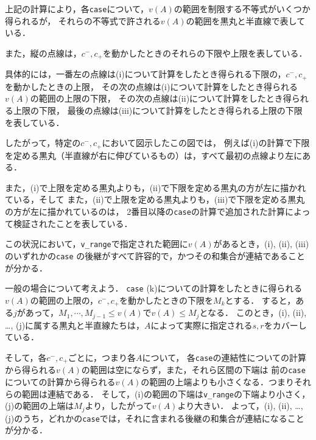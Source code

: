 \documentclass[10pt,a4paper]{ujarticle}
\theoremstyle{definition}
\begin{document}
上記の計算により，各\verb|case|について，$v(A)$の範囲を制限する不等式がいくつか得られるが，
それらの不等式で許される$v(A)$の範囲を黒丸と半直線で表している．

また，縦の点線は，$c^-, c_+$を動かしたときのそれらの下限や上限を表している．

具体的には，一番左の点線は(i)について計算をしたとき得られる下限の，$c^-, c_+$を動かしたときの上限，
その次の点線は(i)について計算をしたとき得られる$v(A)$の範囲の上限の下限，
その次の点線は(ii)について計算をしたとき得られる上限の下限，
最後の点線は(iii)について計算をしたとき得られる上限の下限
を表している．

したがって，特定の$c^-, c_+$において図示したこの図では，
例えば(i)の計算で下限を定める黒丸（半直線が右に伸びているもの）は，すべて最初の点線より左にある．

また，(i)で上限を定める黒丸よりも，(ii)で下限を定める黒丸の方が左に描かれている，そして
また，(ii)で上限を定める黒丸よりも，(iii)で下限を定める黒丸の方が左に描かれているのは，
2番目以降の\verb|case|の計算で追加された計算によって検証されたことを表している．

この状況において，\verb|v_range|で指定された範囲に$v(A)$があるとき，(i), (ii), (iii) のいずれかの\verb|case|
の後継がすべて許容的で，かつその和集合が連結であることが分かる．

一般の場合について考えよう．
\verb|case| (k)についての計算をしたときに得られる$v(A)$の範囲の上限の，$c^-, c_+$を動かしたときの下限を$M_k$とする．
すると，ある$j$があって，$M_1, \cdots, M_{j-1} \le v(A)$で$v(A) \le M_j$となる．
このとき，(i), (ii), \dots, (j)に属する黒丸と半直線たちは，$A$によって実際に指定される$s,r$をカバーしている．

そして，各$c^-, c_+$ごとに，つまり各$A$について，
各\verb|case|の連結性についての計算から得られる$v(A)$の範囲は空にならず，また，それら区間の下端は
前の\verb|case|についての計算から得られる$v(A)$の範囲の上端よりも小さくなる．つまりそれらの範囲は連結である．
そして，(i)の範囲の下端は\verb|v_range|の下端より小さく，(j)の範囲の上端は$M_j$より，したがって$v(A)$より大きい．
よって，(i), (ii), \dots, (j)のうち，どれかの\verb|case|では，それに含まれる後継の和集合が連結になることが分かる．
\end{document}
